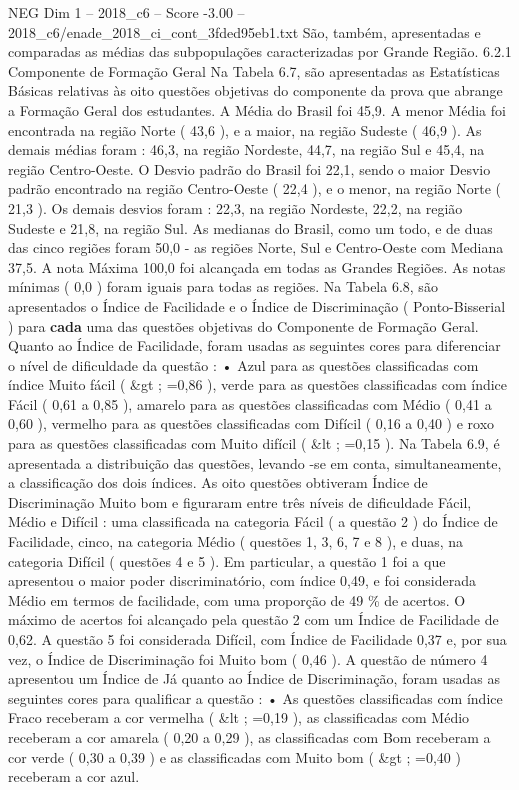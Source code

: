 \begin{textsample}{NEG Dim 1 – 2018\_c6 – Score -3.00 – 2018\_c6/enade\_2018\_ci\_cont\_3fded95eb1.txt}
São, também, apresentadas e comparadas as médias das subpopulações caracterizadas por Grande Região. 6.2.1 Componente de Formação Geral Na Tabela 6.7, são apresentadas as Estatísticas Básicas relativas às oito questões objetivas do componente da prova que abrange a Formação Geral dos estudantes.
A Média do Brasil foi 45,9.
A menor Média foi encontrada na região Norte ( 43,6 ), e a maior, na região Sudeste ( 46,9 ).
As demais médias foram : 46,3, na região Nordeste, 44,7, na região Sul e 45,4, na região Centro-Oeste.
O Desvio padrão do Brasil foi 22,1, sendo o maior Desvio padrão encontrado na região Centro-Oeste ( 22,4 ), e o menor, na região Norte ( 21,3 ).
Os demais desvios foram : 22,3, na região Nordeste, 22,2, na região Sudeste e 21,8, na região Sul.
As medianas do Brasil, como um todo, e de duas das cinco regiões foram 50,0 - as regiões Norte, Sul e Centro-Oeste com Mediana 37,5.
A nota Máxima 100,0 foi alcançada em todas as Grandes Regiões.
As notas mínimas ( 0,0 ) foram iguais para todas as regiões.
Na Tabela 6.8, são apresentados o Índice de Facilidade e o Índice de Discriminação ( Ponto-Bisserial ) para \textbf{cada} uma das questões objetivas do Componente de Formação Geral.
Quanto ao Índice de Facilidade, foram usadas as seguintes cores para diferenciar o nível de dificuldade da questão : • Azul para as questões classificadas com índice Muito fácil ( \&gt ; =0,86 ), verde para as questões classificadas com índice Fácil ( 0,61 a 0,85 ), amarelo para as questões classificadas com Médio ( 0,41 a 0,60 ), vermelho para as questões classificadas com Difícil ( 0,16 a 0,40 ) e roxo para as questões classificadas com Muito difícil ( \&lt ; =0,15 ).
Na Tabela 6.9, é apresentada a distribuição das questões, levando -se em conta, simultaneamente, a classificação dos dois índices.
As oito questões obtiveram Índice de Discriminação Muito bom e figuraram entre três níveis de dificuldade Fácil, Médio e Difícil : uma classificada na categoria Fácil ( a questão 2 ) do Índice de Facilidade, cinco, na categoria Médio ( questões 1, 3, 6, 7 e 8 ), e duas, na categoria Difícil ( questões 4 e 5 ).
Em particular, a questão 1 foi a que apresentou o maior poder discriminatório, com índice 0,49, e foi considerada Médio em termos de facilidade, com uma proporção de 49 \% de acertos.
O máximo de acertos foi alcançado pela questão 2 com um Índice de Facilidade de 0,62.
A questão 5 foi considerada Difícil, com Índice de Facilidade 0,37 e, por sua vez, o Índice de Discriminação foi Muito bom ( 0,46 ).
A questão de número 4 apresentou um Índice de Já quanto ao Índice de Discriminação, foram usadas as seguintes cores para qualificar a questão : • As questões classificadas com índice Fraco receberam a cor vermelha ( \&lt ; =0,19 ), as classificadas com Médio receberam a cor amarela ( 0,20 a 0,29 ), as classificadas com Bom receberam a cor verde ( 0,30 a 0,39 ) e as classificadas com Muito bom ( \&gt ; =0,40 ) receberam a cor azul.

\end{textsample}
